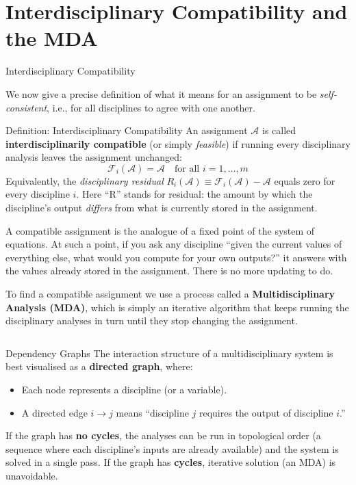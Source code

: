 \documentclass[aspectratio=169,10pt]{beamer}
\begin{document}
\section{Interdisciplinary Compatibility and the MDA}

\begin{frame}[allowframebreaks]{Interdisciplinary Compatibility}

  We now give a precise definition of what it means for an assignment to be
  \emph{self-consistent}, i.e., for all disciplines to agree with one another.

  \begin{block}{Definition: Interdisciplinary Compatibility}
    An assignment $\mathcal{A}$ is called \textbf{interdisciplinarily
    compatible} (or simply \emph{feasible}) if running every disciplinary
    analysis leaves the assignment unchanged:
    \[
      \mathcal{F}_i(\mathcal{A}) = \mathcal{A}
      \quad \text{for all } i = 1, \ldots, m
    \]
    Equivalently, the \emph{disciplinary residual}
    $R_i(\mathcal{A}) \equiv \mathcal{F}_i(\mathcal{A}) - \mathcal{A}$
    equals zero for every discipline $i$.  Here ``R'' stands for residual:
    the amount by which the discipline's output \emph{differs} from what is
    currently stored in the assignment.
  \end{block}

  \medskip
  A compatible assignment is the analogue of a fixed point of the system of
  equations.  At such a point, if you ask any discipline ``given the current
  values of everything else, what would you compute for your own outputs?''
  it answers with the values already stored in the assignment.  There is no
  more updating to do.

  \medskip
  To find a compatible assignment we use a process called a
  \textbf{Multidisciplinary Analysis (MDA)}, which is simply an iterative
  algorithm that keeps running the disciplinary analyses in turn until
  they stop changing the assignment.

  \framebreak

  \begin{columns}[T]
    \begin{block}{Dependency Graphs}
      The interaction structure of a multidisciplinary system is best
      visualised as a \textbf{directed graph}, where:
      \begin{itemize}
        \item Each node represents a discipline (or a variable).
        \item A directed edge $i \to j$ means ``discipline $j$
              requires the output of discipline $i$.''
      \end{itemize}
      If the graph has \textbf{no cycles}, the analyses can be run in
      topological order (a sequence where each discipline's inputs are
      already available) and the system is solved in a single pass.
      If the graph has \textbf{cycles}, iterative solution (an MDA) is
      unavoidable.
    \end{block}


\end{columns}
\end{frame}
\end{document}
